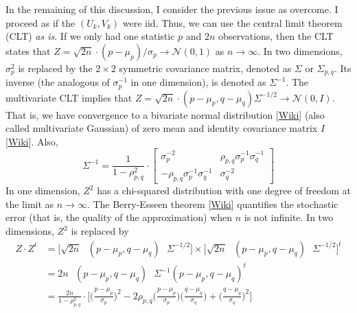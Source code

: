 \documentclass[10pt]{article}
\begin{document}
\begin{Exercise}
In the remaining of this discussion, I consider the previous issue as overcome. I proceed as if the $(U_k,V_k)$ were iid. Thus, we can use the central limit theorem (CLT) {\em as is}. 
If we only had one statistic $p$ and $2n$ observations, then  the CLT states that 
$Z=\sqrt{2n}\cdot(p-\mu_p)/\sigma_p\rightarrow \mathcal{N}(0,1)$
 as $n\rightarrow\infty$. In two dimensions, $\sigma_p^2$ is replaced by the $2\times 2$ symmetric covariance matrix, denoted as $\Sigma$ or $\Sigma_{p,q}$. Its inverse (the analogous of $\sigma_p^{-1}$ in one dimension), is denoted as $\Sigma^{-1}$. The multivariate CLT implies that
$Z = \sqrt{2n} \cdot (p-\mu_p, q-\mu_q)\Sigma^{-1/2}\rightarrow \mathcal{N}(0,I)$. That is, we have convergence to a 
\textcolor{index}{bivariate normal distribution} [\href{https://en.wikipedia.org/wiki/Multivariate_normal_distribution}{Wiki}]
(also called 
\textcolor{index}{multivariate Gaussian})  of zero mean and identity 
\textcolor{index}{covariance matrix} $I$ [\href{https://en.wikipedia.org/wiki/Covariance_matrix}{Wiki}].  Also,
$$\Sigma^{-1}= \frac{1}{1-\rho_{p,q}^2} \cdot 
\begin{bmatrix}
\sigma_p^{-2} & \rho_{p,q} \sigma_p^{-1} \sigma_q^{-1}\\
-\rho_{p,q} \sigma_p^{-1}\sigma_q^{-1}  & \sigma_q^{-2}
\end{bmatrix}
$$
In one dimension, $Z^2$ has a chi-squared distribution with one degree of freedom at the limit as $n\rightarrow\infty$. The 
\textcolor{index}{Berry-Esseen theorem} [\href{https://bit.ly/3Jsq0Ow}{Wiki}]
quantifies the stochastic error (that is, the quality of the approximation) when $n$ is not infinite. In two dimensions,  $Z^2$ is replaced by 
\begin{align}
Z\cdot Z^t & =\Big[\sqrt{2n}\mbox{ }(p-\mu_p, q-\mu_q)\mbox{ }\Sigma^{-1/2}\Big] \times \Big[\sqrt{2n}\mbox{ }(p-\mu_p, q-\mu_q)\mbox{ }\Sigma^{-1/2}\Big]^t  \nonumber \\
  & = 2n\mbox{ } (p-\mu_p, q-\mu_q)\mbox{ }\Sigma^{-1}(p-\mu_p, q-\mu_q)^t \nonumber \\
 & = \frac{2n}{1-\rho_{p,q}^2}\cdot 
\Big[\Big( \frac{p-\mu_p}{\sigma_p}\Big)^2 
-2\rho_{p,q}\Big(\frac{p-\mu_p}{\sigma_p}\Big)\Big(\frac{q-\mu_q}{\sigma_q}\Big) 
+ \Big(\frac{q-\mu_q}{\sigma_q}\Big)^2\Big]  \nonumber
\end{align}

\end{Exercise}
\end{document}
